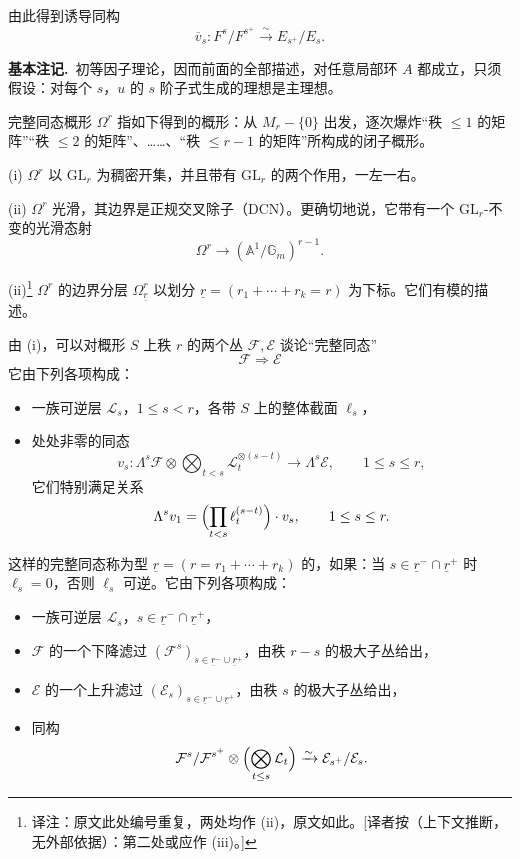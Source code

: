 由此得到诱导同构
\[
\overline{v}_s:F^s/F^{s^+}\xrightarrow{\sim}E_{s^+}/E_s.
\]

\par\medskip\noindent\textbf{基本注记.}\ 初等因子理论，因而前面的全部描述，对任意局部环 $A$ 都成立，只须假设：对每个 $s$，$u$ 的 $s$ 阶子式生成的理想是主理想。

\begin{definition*}
完整同态概形 $\Omega^r$ 指如下得到的概形：从 $M_r-\{0\}$ 出发，逐次爆炸“秩 $\le 1$ 的矩阵”“秩 $\le 2$ 的矩阵”、……、“秩 $\le r-1$ 的矩阵”所构成的闭子概形。
\end{definition*}

\begin{proposition*}
(i) $\Omega^r$ 以 $\mathrm{GL}_r$ 为稠密开集，并且带有 $\mathrm{GL}_r$ 的两个作用，一左一右。

(ii) $\Omega^r$ 光滑，其边界是正规交叉除子（DCN）。更确切地说，它带有一个 $\mathrm{GL}_r$-不变的光滑态射
\[
\Omega^r\to(\mathbb{A}^1/\mathbb{G}_m)^{r-1}.
\]

(ii)\footnote{译注：原文此处编号重复，两处均作 (ii)，原文如此。[译者按（上下文推断，无外部依据）：第二处或应作 (iii)。]} $\Omega^r$ 的边界分层 $\Omega^r_{\underline{r}}$ 以划分 $\underline{r}=(r_1+\cdots+r_k=r)$ 为下标。它们有模的描述。
\end{proposition*}

由 (i)，可以对概形 $S$ 上秩 $r$ 的两个丛 $\mathcal{F},\mathcal{E}$ 谈论“完整同态”
\[
\mathcal{F}\Rightarrow\mathcal{E}
\]
它由下列各项构成：

\begin{itemize}
\item 一族可逆层 $\mathcal{L}_s$，$1\le s<r$，各带 $S$ 上的整体截面 $\ell_s$，
\item 处处非零的同态
\[
v_s:\Lambda^s\mathcal{F}\otimes\bigotimes_{t<s}\mathcal{L}_t^{\otimes(s-t)}\to\Lambda^s\mathcal{E},\qquad 1\le s\le r,
\]
它们特别满足关系
\[
\Lambda^s v_1=\Bigl(\prod_{t<s}\ell_t^{(s-t)}\Bigr)\cdot v_s,\qquad 1\le s\le r.
\]
\end{itemize}

这样的完整同态称为型 $\underline{r}=(r=r_1+\cdots+r_k)$ 的，如果：当 $s\in\underline{r}^-\cap\underline{r}^+$ 时 $\ell_s=0$，否则 $\ell_s$ 可逆。它由下列各项构成：

\begin{itemize}
\item 一族可逆层 $\mathcal{L}_s$，$s\in\underline{r}^-\cap\underline{r}^+$，
\item $\mathcal{F}$ 的一个下降滤过 $(\mathcal{F}^s)_{s\in\underline{r}^-\cup\underline{r}^+}$，由秩 $r-s$ 的极大子丛给出，
\item $\mathcal{E}$ 的一个上升滤过 $(\mathcal{E}_s)_{s\in\underline{r}^-\cup\underline{r}^+}$，由秩 $s$ 的极大子丛给出，
\item 同构
\[
\mathcal{F}^s/\mathcal{F}^{s^+}\otimes\Bigl(\bigotimes_{t\le s}\mathcal{L}_t\Bigr)\xrightarrow{\sim}\mathcal{E}_{s^+}/\mathcal{E}_s.
\]
\end{itemize}

